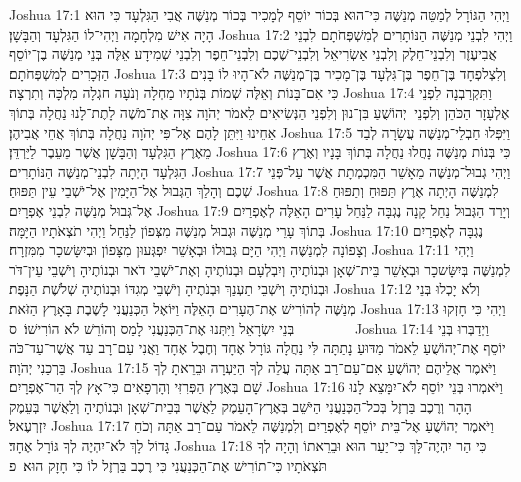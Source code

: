 Joshua 17:1	וַיְהִי הַגּוֹרָל לְמַטֵּה מְנַשֶּׁה כִּי־הוּא בְּכוֹר יוֹסֵף לְמָכִיר בְּכוֹר מְנַשֶּׁה אֲבִי הַגִּלְעָד כִּי הוּא הָיָה אִישׁ מִלְחָמָה וַיְהִי־לוֹ הַגִּלְעָד וְהַבָּשָׁן׃
Joshua 17:2	וַיְהִי לִבְנֵי מְנַשֶּׁה הַנּוֹתָרִים לְמִשְׁפְּחֹתָם לִבְנֵי אֲבִיעֶזֶר וְלִבְנֵי־חֵלֶק וְלִבְנֵי אַשְׂרִיאֵל וְלִבְנֵי־שֶׁכֶם וְלִבְנֵי־חֵפֶר וְלִבְנֵי שְׁמִידָע אֵלֶּה בְּנֵי מְנַשֶּׁה בֶן־יוֹסֵף הַזְּכָרִים לְמִשְׁפְּחֹתָם׃
Joshua 17:3	וְלִצְלפְחָד בֶּן־חֵפֶר בֶּן־גִּלְעָד בֶּן־מָכִיר בֶּן־מְנַשֶּׁה לֹא־הָיוּ לוֹ בָּנִים כִּי אִם־בָּנוֹת וְאֵלֶּה שְׁמוֹת בְּנֹתָיו מַחְלָה וְנֹעָה חגְלָה מִלְכָּה וְתִרְצָה׃
Joshua 17:4	וַתִּקְרַבְנָה לִפְנֵי אֶלְעָזָר הַכֹּהֵן וְלִפְנֵי  יְהוֹשֻׁעַ בִּן־נוּן וְלִפְנֵי הַנְּשִׂיאִים לֵאמֹר יְהֹוָה צִוָּה אֶת־מֹשֶׁה לָתֶת־לָנוּ נַחֲלָה בְּתוֹךְ אַחֵינוּ וַיִּתֵּן לָהֶם אֶל־פִּי יְהֹוָה נַחֲלָה בְּתוֹךְ אֲחֵי אֲבִיהֶן׃
Joshua 17:5	וַיִּפְּלוּ חַבְלֵי־מְנַשֶּׁה עֲשָׂרָה לְבַד מֵאֶרֶץ הַגִּלְעָד וְהַבָּשָׁן אֲשֶׁר מֵעֵבֶר לַיַּרְדֵּן׃
Joshua 17:6	כִּי בְּנוֹת מְנַשֶּׁה נָחֲלוּ נַחֲלָה בְּתוֹךְ בָּנָיו וְאֶרֶץ הַגִּלְעָד הָיְתָה לִבְנֵי־מְנַשֶּׁה הַנּוֹתָרִים׃
Joshua 17:7	וַיְהִי גְבוּל־מְנַשֶּׁה מֵאָשֵׁר הַמִּכְמְתָת אֲשֶׁר עַל־פְּנֵי שְׁכֶם וְהָלַךְ הַגְּבוּל אֶל־הַיָּמִין אֶל־יֹשְׁבֵי עֵין תַּפּוּחַ׃
Joshua 17:8	לִמְנַשֶּׁה הָיְתָה אֶרֶץ תַּפּוּחַ וְתַפּוּחַ אֶל־גְּבוּל מְנַשֶּׁה לִבְנֵי אֶפְרָיִם׃
Joshua 17:9	וְיָרַד הַגְּבוּל נַחַל קָנָה נֶגְבָּה לַנַּחַל עָרִים הָאֵלֶּה לְאֶפְרַיִם בְּתוֹךְ עָרֵי מְנַשֶּׁה וּגְבוּל מְנַשֶּׁה מִצְּפוֹן לַנַּחַל וַיְהִי תֹצְאֹתָיו הַיָּמָּה׃
Joshua 17:10	נֶגְבָּה לְאֶפְרַיִם וְצָפוֹנָה לִמְנַשֶּׁה וַיְהִי הַיָּם גְּבוּלוֹ וּבְאָשֵׁר יִפְגְּעוּן מִצָּפוֹן וּבְיִשָּׂשכָר מִמִּזְרָח׃
Joshua 17:11	וַיְהִי לִמְנַשֶּׁה בְּיִשָּׂשכָר וּבְאָשֵׁר בֵּית־שְׁאָן וּבְנוֹתֶיהָ וְיִבְלְעָם וּבְנוֹתֶיהָ וְאֶת־יֹשְׁבֵי דֹאר וּבְנוֹתֶיהָ וְיֹשְׁבֵי עֵין־דֹּר וּבְנוֹתֶיהָ וְיֹשְׁבֵי תַעְנַךְ וּבְנֹתֶיהָ וְיֹשְׁבֵי מְגִדּוֹ וּבְנוֹתֶיהָ שְׁלֹשֶׁת הַנָּפֶת׃
Joshua 17:12	וְלֹא יָכְלוּ בְּנֵי מְנַשֶּׁה לְהוֹרִישׁ אֶת־הֶעָרִים הָאֵלֶּה וַיּוֹאֶל הַכְּנַעֲנִי לָשֶׁבֶת בָּאָרֶץ הַזֹּאת׃
Joshua 17:13	וַיְהִי כִּי חָזְקוּ בְּנֵי יִשְׂרָאֵל וַיִּתְּנוּ אֶת־הַכְּנַעֲנִי לָמַס וְהוֹרֵשׁ לֹא הוֹרִישׁוֹ׃ {ס}        
Joshua 17:14	וַיְדַבְּרוּ בְּנֵי יוֹסֵף אֶת־יְהוֹשֻׁעַ לֵאמֹר מַדּוּעַ נָתַתָּה לִּי נַחֲלָה גּוֹרָל אֶחָד וְחֶבֶל אֶחָד וַאֲנִי עַם־רָב עַד אֲשֶׁר־עַד־כֹּה בֵּרְכַנִי יְהֹוָה׃
Joshua 17:15	וַיֹּאמֶר אֲלֵיהֶם יְהוֹשֻׁעַ אִם־עַם־רַב אַתָּה עֲלֵה לְךָ הַיַּעְרָה וּבֵרֵאתָ לְךָ שָׁם בְּאֶרֶץ הַפְּרִזִּי וְהָרְפָאִים כִּי־אָץ לְךָ הַר־אֶפְרָיִם׃
Joshua 17:16	וַיֹּאמְרוּ בְּנֵי יוֹסֵף לֹא־יִמָּצֵא לָנוּ הָהָר וְרֶכֶב בַּרְזֶל בְּכל־הַכְּנַעֲנִי הַיֹּשֵׁב בְּאֶרֶץ־הָעֵמֶק לַאֲשֶׁר בְּבֵית־שְׁאָן וּבְנוֹתֶיהָ וְלַאֲשֶׁר בְּעֵמֶק יִזְרְעֶאל׃
Joshua 17:17	וַיֹּאמֶר יְהוֹשֻׁעַ אֶל־בֵּית יוֹסֵף לְאֶפְרַיִם וְלִמְנַשֶּׁה לֵאמֹר עַם־רַב אַתָּה וְכֹחַ גָּדוֹל לָךְ לֹא־יִהְיֶה לְךָ גּוֹרָל אֶחָד׃
Joshua 17:18	כִּי הַר יִהְיֶה־לָּךְ כִּי־יַעַר הוּא וּבֵרֵאתוֹ וְהָיָה לְךָ תֹּצְאֹתָיו כִּי־תוֹרִישׁ אֶת־הַכְּנַעֲנִי כִּי רֶכֶב בַּרְזֶל לוֹ כִּי חָזָק הוּא׃ {פ}
